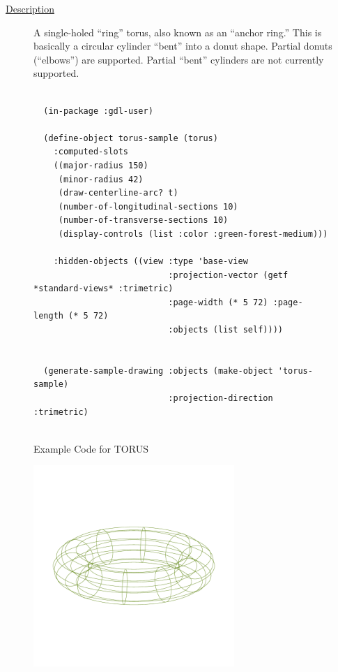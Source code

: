 \documentclass [11pt]{book}
\begin{document}
\begin{itemize}
\begin{description}

\item [
\underline{Description}]


A single-holed ``ring'' torus, also known as an ``anchor ring.''
This is basically a circular cylinder ``bent'' into a donut shape. Partial donuts (``elbows'') are supported.
Partial ``bent'' cylinders are not currently supported.



\end{description}




\begin{figure}
\begin{lrbox}{\boxedverb}
\begin{minipage}{\linewidth}
{\small

\begin{verbatim}
  
  (in-package :gdl-user)
  
  (define-object torus-sample (torus)
    :computed-slots
    ((major-radius 150)
     (minor-radius 42)
     (draw-centerline-arc? t)
     (number-of-longitudinal-sections 10)
     (number-of-transverse-sections 10)
     (display-controls (list :color :green-forest-medium)))

    :hidden-objects ((view :type 'base-view
                           :projection-vector (getf *standard-views* :trimetric)
                           :page-width (* 5 72) :page-length (* 5 72)
                           :objects (list self))))
  

  (generate-sample-drawing :objects (make-object 'torus-sample) 
                           :projection-direction :trimetric)
                  

\end{verbatim}}
\end{minipage}
\end{lrbox}
\fbox{\usebox{\boxedverb}}

\caption{Example Code for TORUS}

\label{fig:example-code-TORUS}

\end{figure}

\begin{figure}
\begin{center}
\includegraphics[width=3in,height=3in]{../images/example-torus.pdf}
\end{center}


\end{figure}
\end{itemize}
\end{document}
